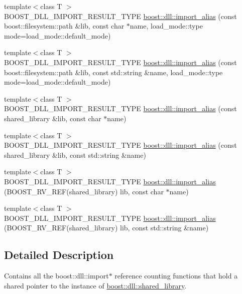 \begin{DoxyCompactItemize}
\item 
{\footnotesize template$<$class T $>$ }\\B\+O\+O\+S\+T\+\_\+\+D\+L\+L\+\_\+\+I\+M\+P\+O\+R\+T\+\_\+\+R\+E\+S\+U\+L\+T\+\_\+\+T\+Y\+PE \hyperlink{a00254_a31e7946affed32f3bebb416ccca9b454}{boost\+::dll\+::import\+\_\+alias} (const boost\+::filesystem\+::path \&lib, const char $\ast$name, load\+\_\+mode\+::type mode=load\+\_\+mode\+::default\+\_\+mode)
\item 
{\footnotesize template$<$class T $>$ }\\B\+O\+O\+S\+T\+\_\+\+D\+L\+L\+\_\+\+I\+M\+P\+O\+R\+T\+\_\+\+R\+E\+S\+U\+L\+T\+\_\+\+T\+Y\+PE \hyperlink{a00254_a5ad71130573fdd290315a87d95fb92c8}{boost\+::dll\+::import\+\_\+alias} (const boost\+::filesystem\+::path \&lib, const std\+::string \&name, load\+\_\+mode\+::type mode=load\+\_\+mode\+::default\+\_\+mode)
\item 
{\footnotesize template$<$class T $>$ }\\B\+O\+O\+S\+T\+\_\+\+D\+L\+L\+\_\+\+I\+M\+P\+O\+R\+T\+\_\+\+R\+E\+S\+U\+L\+T\+\_\+\+T\+Y\+PE \hyperlink{a00254_aefeda3de57b4871b66bd42ee1199e6fe}{boost\+::dll\+::import\+\_\+alias} (const shared\+\_\+library \&lib, const char $\ast$name)
\item 
{\footnotesize template$<$class T $>$ }\\B\+O\+O\+S\+T\+\_\+\+D\+L\+L\+\_\+\+I\+M\+P\+O\+R\+T\+\_\+\+R\+E\+S\+U\+L\+T\+\_\+\+T\+Y\+PE \hyperlink{a00254_a30560963e2e72d0314053673c30b137e}{boost\+::dll\+::import\+\_\+alias} (const shared\+\_\+library \&lib, const std\+::string \&name)
\item 
{\footnotesize template$<$class T $>$ }\\B\+O\+O\+S\+T\+\_\+\+D\+L\+L\+\_\+\+I\+M\+P\+O\+R\+T\+\_\+\+R\+E\+S\+U\+L\+T\+\_\+\+T\+Y\+PE \hyperlink{a00254_ae6a8129836f1674c746a4af58c7e7104}{boost\+::dll\+::import\+\_\+alias} (B\+O\+O\+S\+T\+\_\+\+R\+V\+\_\+\+R\+EF(shared\+\_\+library) lib, const char $\ast$name)
\item 
{\footnotesize template$<$class T $>$ }\\B\+O\+O\+S\+T\+\_\+\+D\+L\+L\+\_\+\+I\+M\+P\+O\+R\+T\+\_\+\+R\+E\+S\+U\+L\+T\+\_\+\+T\+Y\+PE \hyperlink{a00254_aeafedb58798e9bf6b793f3b54ac7bcfd}{boost\+::dll\+::import\+\_\+alias} (B\+O\+O\+S\+T\+\_\+\+R\+V\+\_\+\+R\+EF(shared\+\_\+library) lib, const std\+::string \&name)
\end{DoxyCompactItemize}


\subsection{Detailed Description}
Contains all the boost\+::dll\+::import$\ast$ reference counting functions that hold a shared pointer to the instance of \hyperlink{a01708}{boost\+::dll\+::shared\+\_\+library}. 



